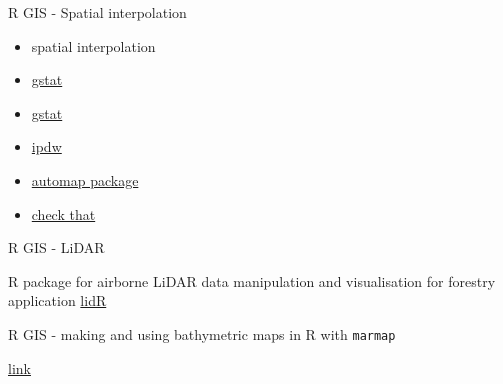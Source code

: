 \documentclass[8pt,ignorenonframetext,]{beamer}
\providecommand{\tightlist}{%
  \setlength{\itemsep}{0pt}\setlength{\parskip}{0pt}}
\begin{document}
\begin{frame}{R GIS - Spatial interpolation}

\begin{itemize}
\tightlist
\item
  spatial interpolation
\item
  \href{http://rspatial.org/analysis/rst/4-interpolation.html}{gstat}
\item
  \href{https://rpubs.com/nabilabd/118172}{gstat}
\item
  \href{https://cran.r-project.org/web/packages/ipdw/vignettes/ipdw2.html}{ipdw}
\item
  \href{http://www.numbertheory.nl/2013/02/17/automatic-spatial-interpolation-with-r-the-automap-package/}{automap
  package}
\item
  \href{https://mgimond.github.io/Spatial/interpolation-in-r.html}{check
  that}
\end{itemize}

\end{frame}

\begin{frame}{R GIS - LiDAR}

R package for airborne LiDAR data manipulation and visualisation for
forestry application \href{https://github.com/Jean-Romain/lidR}{lidR}

\end{frame}

\begin{frame}{R GIS - making and using bathymetric maps in R with
\texttt{marmap}}

\href{https://www.ncbi.nlm.nih.gov/pmc/articles/PMC3760912/}{link}

\end{frame}
\end{document}
